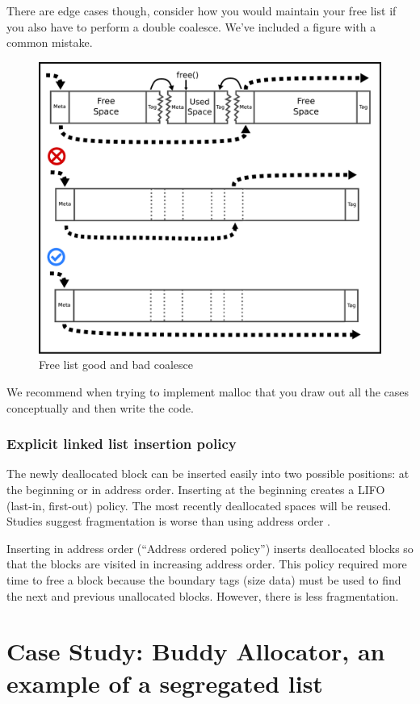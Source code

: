 There are edge cases though, consider how you would maintain your free list if you also have to perform a double coalesce.
We've included a figure with a common mistake.

\begin{figure}[H]
\centering
\includegraphics[width=.7\textwidth]{malloc/drawings/free_list_ptrs.eps}
\caption{Free list good and bad coalesce}
\end{figure}

We recommend when trying to implement malloc that you draw out all the cases conceptually and then write the code.

\subsubsection{Explicit linked list insertion policy}

The newly deallocated block can be inserted easily into two possible positions: at the beginning or in address order.
Inserting at the beginning creates a LIFO (last-in, first-out) policy.
The most recently deallocated spaces will be reused. Studies suggest fragmentation is worse than using address order \cite{10.1007/3-540-60368-9_19}.

Inserting in address order (``Address ordered policy'') inserts deallocated blocks so that the blocks are visited in increasing address order.
This policy required more time to free a block because the boundary tags (size data) must be used to find the next and previous unallocated blocks.
However, there is less fragmentation.

\section{Case Study: Buddy Allocator, an example of a segregated list}


